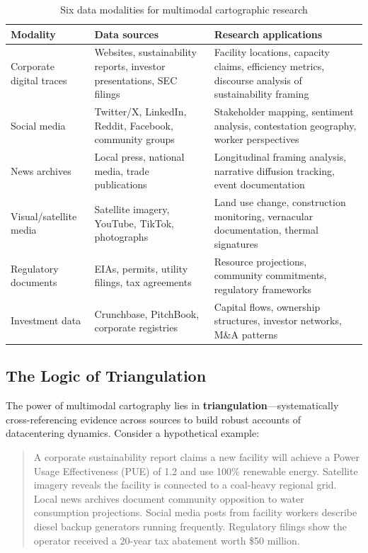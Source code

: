 \documentclass[review]{elsarticle}
\begin{document}
\begin{table}[h]
\caption{Six data modalities for multimodal cartographic research}
\label{tab:modalities}
\begin{tabular}{p{2.5cm}p{4cm}p{5.5cm}}
\toprule
\textbf{Modality} & \textbf{Data sources} & \textbf{Research applications} \\
\midrule
Corporate digital traces & Websites, sustainability reports, investor presentations, SEC filings & Facility locations, capacity claims, efficiency metrics, discourse analysis of sustainability framing \\
\addlinespace
Social media & Twitter/X, LinkedIn, Reddit, Facebook, community groups & Stakeholder mapping, sentiment analysis, contestation geography, worker perspectives \\
\addlinespace
News archives & Local press, national media, trade publications & Longitudinal framing analysis, narrative diffusion tracking, event documentation \\
\addlinespace
Visual/satellite media & Satellite imagery, YouTube, TikTok, photographs & Land use change, construction monitoring, vernacular documentation, thermal signatures \\
\addlinespace
Regulatory documents & EIAs, permits, utility filings, tax agreements & Resource projections, community commitments, regulatory frameworks \\
\addlinespace
Investment data & Crunchbase, PitchBook, corporate registries & Capital flows, ownership structures, investor networks, M\&A patterns \\
\bottomrule
\end{tabular}
\end{table}

\subsection{The Logic of Triangulation}

The power of multimodal cartography lies in \textbf{triangulation}---systematically cross-referencing evidence across sources to build robust accounts of datacentering dynamics. Consider a hypothetical example:

\begin{quote}
A corporate sustainability report claims a new facility will achieve a Power Usage Effectiveness (PUE) of 1.2 and use 100\% renewable energy. Satellite imagery reveals the facility is connected to a coal-heavy regional grid. Local news archives document community opposition to water consumption projections. Social media posts from facility workers describe diesel backup generators running frequently. Regulatory filings show the operator received a 20-year tax abatement worth \$50 million.
\end{quote}
\end{document}
